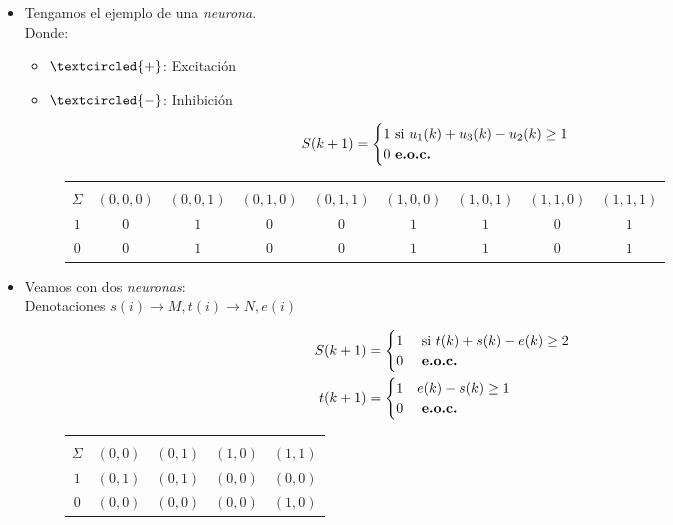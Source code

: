 \begin{itemize}
\item Tengamos el ejemplo de una \textit{neurona}. \\
Donde:
\begin{itemize}
\item $\textcircled{{\scriptsize +}}$: Excitación
\item $\textcircled{-}$: Inhibición
\end{itemize}
\begin{figure}[ht!]
\centering
{}
\end{figure}
$$S(k+1)=
\begin{cases}
1 \text{ si } u_1(k) +u_3(k) - u_2(k) \geq 1 \\
0 \text{ \textbf{e.o.c.} }
\end{cases}
$$
\begin{figure}[ht]
\centering
\begin{tabular}{|c|cccccccc|}
    \hline
    \backslashbox{$k$}{\vspace{0.1pt}\\$\Sigma$} & $(0,0,0)$ & $(0,0,1)$ & $(0,1,0)$ & $(0,1,1)$ & $(1,0,0)$ & $(1,0,1)$ & $(1,1,0)$ & $(1,1,1)$\\ \hline
                $1$ & $0$ & $1$  & $0$ & $0$ & $1$ & $1$ & $0$ & $1$ \\ 
                $0$ & $0$ & $1$  & $0$ & $0$ & $1$ & $1$ & $0$ & $1$ \\ \hline
\end{tabular} 
\end{figure}
\item Veamos con dos \textit{neuronas}: \\
Denotaciones $s(i) \rightarrow M , t(i) \rightarrow N,e(i)$
\begin{figure}[ht!]
\centering
{}
\end{figure}
\begin{align*}
S(k+1) &=  
\begin{cases}
1 & \text{ si } t(k) +s(k) - e(k) \geq 2 \\
0 & \text{ \textbf{e.o.c.} }
\end{cases} \\
t(k+1) &=
\begin{cases}
1 & e(k)-s(k) \geq 1 \\
0 & \text{ \textbf{e.o.c.} }
\end{cases}
\end{align*}
\begin{figure}[ht]
\centering
\begin{tabular}{|c|cccc|}
    \hline
    \backslashbox{$k$}{\vspace{0.1pt}\\$\Sigma$} & $(0,0)$ & $(0,1)$ & $(1,0)$ & $(1,1)$ \\ \hline
                $1$ & $(0,1)$ & $(0,1)$ & $(0,0)$  & $(0,0)$  \\ 
                $0$ & $(0,0)$ & $(0,0)$ & $(0,0)$  & $(1,0)$  \\ \hline
\end{tabular} 
\end{figure}
\end{itemize}
